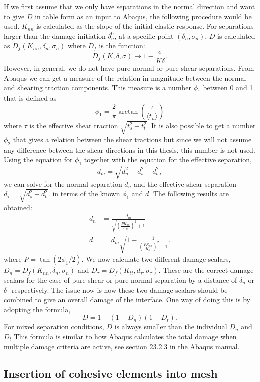 \documentclass[grain_boundary_law.tex]{subfiles}
\begin{document}
If we first assume that we only have separations in the normal direction and want to give $D$ in table form as an input to Abaqus, the following procedure would be used. $K_{nn}$ is calculated as the slope of the initial elastic response. For separations larger than the damage initiation $\delta_n^0$,  at a specific point $(\delta_n, \sigma_n)$, $D$ is calculated as $D_f(K_{nn}, \delta_n, \sigma_n)$ where $D_f$ is the function:
%
\[ D_f(K, \delta, \sigma) \mapsto   1 - \frac{\sigma}{K\delta}. \]
%
However, in general, we do not have pure normal or pure shear separations. From Abaqus we can get a measure of the relation in magnitude between the normal and shearing traction components. This measure is a number $\phi_1$ between 0 and 1 that is defined as
%
\[ \phi_1 = \frac{2}{\pi} \arctan \left( \frac{ \tau}{\langle t_n \rangle} \right) \]
%
where $\tau$ is the effective shear traction $\sqrt{t_s^2 + t_t^2}$. It is also possible to get a number $\phi_2$ that gives a relation between the shear tractions but since we will not assume any difference between the shear directions in this thesis, this number is not used. Using the equation for $\phi_1$ together with the equation for the effective separation,
%
\[ d_m = \sqrt{d_n^2 + d_s^2 + d_t^2},  \]
%
we can solve for the normal separation $d_n$ and the effective shear separation $ d_\tau = \sqrt{d_s^2 + d_t^2}.$ in terms of the known $\phi_1$ and $d$. The following results are obtained:
%
\begin{align}
 d_n & = \frac{d_m}{\sqrt{\left(\frac{PK_{nn}}{K_{tt}}\right)^2 + 1 }  }  \\
 d_\tau  & = d_m\sqrt{1 -\frac{1}{\left(\frac{PK_{nn}}{K_{tt}} \right)^2 + 1 }}.
\end{align}
%
where $P = \tan(2 \phi_1 / 2)$. We now calculate two different damage scalars, $D_n = D_f(K_{nn}, \delta_n, \sigma_n)$ and $D_\tau = D_f(K_{tt}, d_\tau, \sigma_\tau)$. These are the correct damage scalars for the case of pure shear or pure normal separation by a distance of $\delta_n$ or $\delta_\tau$ respectively. The issue now is how these two damage scalars should be combined to give an overall damage of the interface. One way of doing this is by adopting the formula,
%
\[ D = 1 - (1 - D_n)(1 - D_t). \]
%
For mixed separation conditions, $D$ is always smaller than the individual $D_n$ and $D_t$ This formula is similar to how Abaqus calculates the total damage when multiple damage criteria are active, see section 23.2.3 in the Abaqus manual. 


\subsection{Insertion of cohesive elements into mesh}
\end{document}
